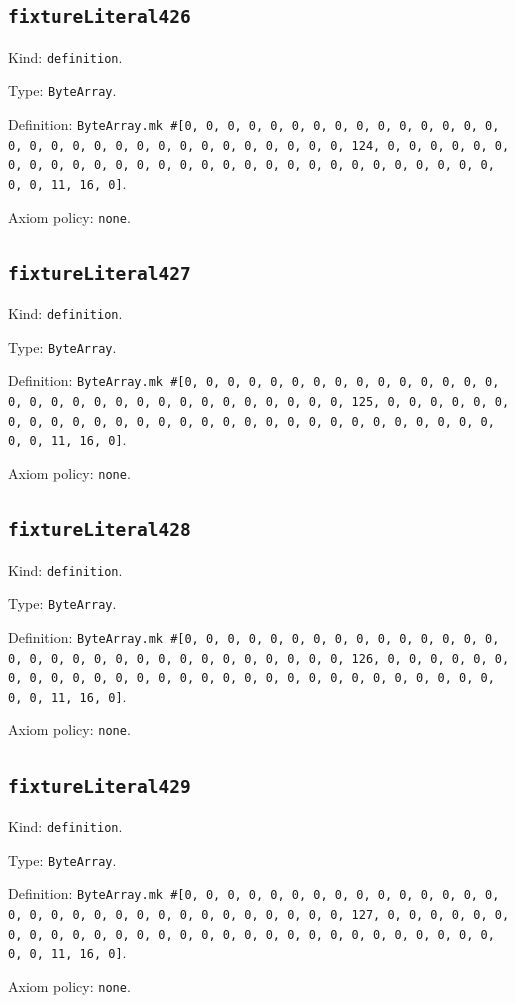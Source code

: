 \documentclass[11pt]{article}
\begin{document}
\subsection*{\texttt{fixtureLiteral426}}
\noindent Kind: \texttt{definition}.\par
\noindent Type: \texttt{ByteArray}.\par
\noindent Definition: \texttt{ByteArray.mk \#[0, 0, 0, 0, 0, 0, 0, 0, 0, 0, 0, 0, 0, 0, 0, 0, 0, 0, 0, 0, 0, 0, 0, 0, 0, 0, 0, 0, 0, 0, 0, 124, 0, 0, 0, 0, 0, 0, 0, 0, 0, 0, 0, 0, 0, 0, 0, 0, 0, 0, 0, 0, 0, 0, 0, 0, 0, 0, 0, 0, 0, 0, 0, 11, 16, 0]}.\par
\noindent Axiom policy: \texttt{none}.\par
\subsection*{\texttt{fixtureLiteral427}}
\noindent Kind: \texttt{definition}.\par
\noindent Type: \texttt{ByteArray}.\par
\noindent Definition: \texttt{ByteArray.mk \#[0, 0, 0, 0, 0, 0, 0, 0, 0, 0, 0, 0, 0, 0, 0, 0, 0, 0, 0, 0, 0, 0, 0, 0, 0, 0, 0, 0, 0, 0, 0, 125, 0, 0, 0, 0, 0, 0, 0, 0, 0, 0, 0, 0, 0, 0, 0, 0, 0, 0, 0, 0, 0, 0, 0, 0, 0, 0, 0, 0, 0, 0, 0, 11, 16, 0]}.\par
\noindent Axiom policy: \texttt{none}.\par
\subsection*{\texttt{fixtureLiteral428}}
\noindent Kind: \texttt{definition}.\par
\noindent Type: \texttt{ByteArray}.\par
\noindent Definition: \texttt{ByteArray.mk \#[0, 0, 0, 0, 0, 0, 0, 0, 0, 0, 0, 0, 0, 0, 0, 0, 0, 0, 0, 0, 0, 0, 0, 0, 0, 0, 0, 0, 0, 0, 0, 126, 0, 0, 0, 0, 0, 0, 0, 0, 0, 0, 0, 0, 0, 0, 0, 0, 0, 0, 0, 0, 0, 0, 0, 0, 0, 0, 0, 0, 0, 0, 0, 11, 16, 0]}.\par
\noindent Axiom policy: \texttt{none}.\par
\subsection*{\texttt{fixtureLiteral429}}
\noindent Kind: \texttt{definition}.\par
\noindent Type: \texttt{ByteArray}.\par
\noindent Definition: \texttt{ByteArray.mk \#[0, 0, 0, 0, 0, 0, 0, 0, 0, 0, 0, 0, 0, 0, 0, 0, 0, 0, 0, 0, 0, 0, 0, 0, 0, 0, 0, 0, 0, 0, 0, 127, 0, 0, 0, 0, 0, 0, 0, 0, 0, 0, 0, 0, 0, 0, 0, 0, 0, 0, 0, 0, 0, 0, 0, 0, 0, 0, 0, 0, 0, 0, 0, 11, 16, 0]}.\par
\noindent Axiom policy: \texttt{none}.\par
\end{document}
